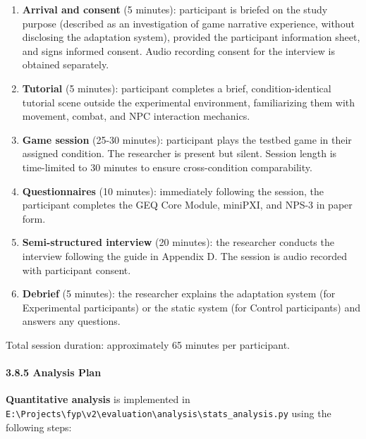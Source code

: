 \begin{enumerate}
\def\labelenumi{\arabic{enumi}.}
\tightlist
\item
  \textbf{Arrival and consent} (5 minutes): participant is briefed on
  the study purpose (described as an investigation of game narrative
  experience, without disclosing the adaptation system), provided the
  participant information sheet, and signs informed consent. Audio
  recording consent for the interview is obtained separately.
\item
  \textbf{Tutorial} (5 minutes): participant completes a brief,
  condition-identical tutorial scene outside the experimental
  environment, familiarizing them with movement, combat, and NPC
  interaction mechanics.
\item
  \textbf{Game session} (25-30 minutes): participant plays the testbed
  game in their assigned condition. The researcher is present but
  silent. Session length is time-limited to 30 minutes to ensure
  cross-condition comparability.
\item
  \textbf{Questionnaires} (10 minutes): immediately following the
  session, the participant completes the GEQ Core Module, miniPXI, and
  NPS-3 in paper form.
\item
  \textbf{Semi-structured interview} (20 minutes): the researcher
  conducts the interview following the guide in Appendix D. The session
  is audio recorded with participant consent.
\item
  \textbf{Debrief} (5 minutes): the researcher explains the adaptation
  system (for Experimental participants) or the static system (for
  Control participants) and answers any questions.
\end{enumerate}

Total session duration: approximately 65 minutes per participant.

\paragraph{3.8.5 Analysis Plan}\label{analysis-plan}

\textbf{Quantitative analysis} is implemented in
\texttt{E:\textbackslash{}Projects\textbackslash{}fyp\textbackslash{}v2\textbackslash{}evaluation\textbackslash{}analysis\textbackslash{}stats\_analysis.py}
using the following steps:

